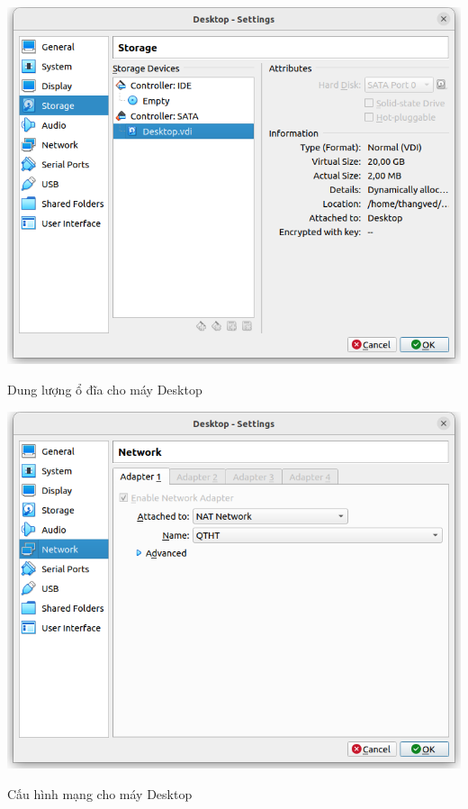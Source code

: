 \documentclass[a4paper, 11pt]{article}
\begin{document}
\begin{itemize}
\begin{enumerate}
                    \begin{minipage}
                        {\linewidth}
                        \captionsetup{type=figure}
                        \centering
                        \includegraphics[width=\linewidth]{images/desktop-disk.png}
                        \caption{Dung lượng ổ đĩa cho máy Desktop}
                        \label{figure:desktop-disk}
                    \end{minipage}

                    \begin{minipage}
                        {\linewidth}
                        \captionsetup{type=figure}
                        \centering
                        \includegraphics[width=\linewidth]{images/desktop-network.png}
                        \caption{Cấu hình mạng cho máy Desktop}
                        \label{figure:desktop-network}
                    \end{minipage}
          \end{enumerate}


\end{itemize}
\end{document}
